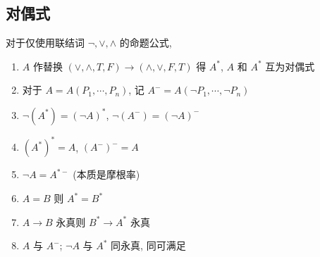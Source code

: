\documentclass[11pt,a4paper,twocolumn,fleqn]{article} %
\begin{document}
\subsection{对偶式} %
\label{sub:duality}
对于仅使用联结词 $\lnot, \lor, \land$ 的命题公式, 
\begin{enumerate}
	\item $A$ 作替换 $(\lor, \land, T, F) \to (\land, \lor, F, T)$ 得 $A^*$, 
	$A$ 和 $A^*$ 互为对偶式
	\item 对于 $A = A(P_1, \cdots, P_n)$, 记 
	$A^- = A(\lnot P_1, \cdots, \lnot P_n)$
	\item $\lnot(A^*) = (\lnot A)^*$, $\lnot(A^-) = (\lnot A)^-$
	\item $(A^*)^* = A$, $(A^-)^- = A$
	\item $\lnot A = A^{*-}$ (本质是摩根率)
	\item $A = B$ 则 $A^* = B^*$
	\item $A\to B$ 永真则 $B^*\to A^*$ 永真
	\item $A$ 与 $A^-$; $\lnot A$ 与 $A^*$ 同永真, 同可满足
\end{enumerate}
\end{document}
